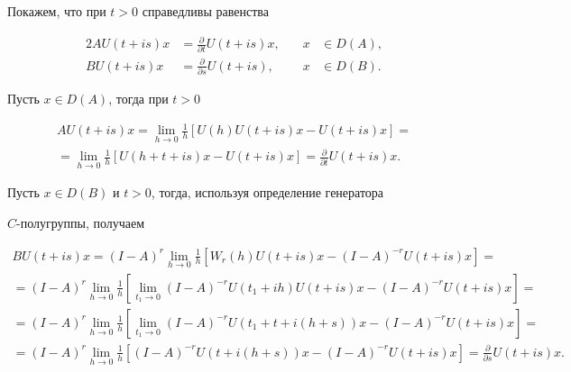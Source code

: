 \begin{pf}
Покажем, что при $t>0$ справедливы равенства


\begin{alignat}{2}\label{20}


AU(t+is)x&=\frac{\partial}{\partial t}U(t+is)x, &\quad  x&\in D(A), \\


%


\label{21}


BU(t+is)x&=\frac{\partial}{\partial s}U(t+is), &\quad  x&\in D(B).


\end{alignat}


Пусть $x\in D(A)$, тогда при $t>0$


\begin{multline*}


AU(t+is)x=\lim\limits_{h\to 0}\frac{1}{h}[U(h)U(t+is)x-U(t+is)x]= \\


%


=\lim\limits_{h\to 0}\frac{1}{h}[U(h+t+is)x-U(t+is)x]=


\frac{\partial}{\partial t}U(t+is)x.


\end{multline*}


Пусть $x\in D(B)$ и $t>0$, тогда, используя определение генератора


$C$-полугруппы, получаем


\begin{multline*}


BU(t+is)x=(I-A)^r\lim_{h\to 0}


\frac{1}{h}[W_r(h)U(t+is)x-(I-A)^{-r}U(t+is)x]= \\


%


=(I-A)^r\lim_{h\to 0}\frac{1}{h}[\lim_{t_1\to 0}(I-A)^{-r}U(t_1+ih)U(t+is)x-


(I-A)^{-r}U(t+is)x]= \\


%


=(I-A)^r\lim_{h\to 0}\frac{1}{h}[\lim_{t_1\to 0}(I-A)^{-r}U(t_1+t+i(h+s))x-


(I-A)^{-r}U(t+is)x]= \\


%


=(I-A)^r\lim_{h\to 0}\frac{1}{h}[(I-A)^{-r}U(t+i(h+s))x-(I-A)^{-r}U(t+is)x]=


\frac{\partial}{\partial s}U(t+is)x.


\end{multline*}



\end{pf}
